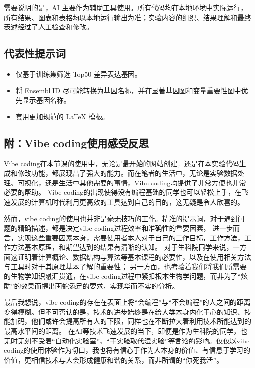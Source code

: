 \documentclass[12pt,fontset=fandol]{ctexart}
\begin{document}
需要说明的是，AI 主要作为辅助工具使用。所有代码均在本地环境中实际运行，所有结果、图表和表格均以本地运行输出为准；实验内容的组织、结果理解和最终表述经过了人工检查和修改。

\subsection{代表性提示词}
\begin{itemize}
  \item 仅基于训练集筛选 Top50 差异表达基因。
  \item 将 Ensembl ID 尽可能转换为基因名称，并在显著基因图和变量重要性图中优先显示基因名称。
  \item 套用更加规范的 LaTeX 模板。
\end{itemize}

\subsection{附：Vibe coding使用感受反思}

Vibe coding在本节课的使用中，无论是最开始的网站创建，还是在本实验代码生成和修改功能，都展现出了强大的能力。而在笔者的生活中，无论是实验数据处理、可视化，还是生活中其他需要的事情，Vibe coding均提供了非常方便也非常必要的帮助。
Vibe coding的出现使得没有编程基础的同学也可以轻松上手，在飞速发展的计算机时代利用更高效的工具达到自己的目的，这无疑是令人欣喜的。

然而，vibe coding的使用也并非是毫无技巧的工作。精准的提示词，对于遇到问题的精确描述，都是决定vibe coding过程效率和准确性的重要因素。
进一步而言，实现这些重要因素本身，需要使用者本人对于自己的工作目标，工作方法，工作方法基本原理，和期望达到的结果有清晰的认知。
对于生科院同学来说，一方面这证明着计算概论、数据结构与算法等基本课程的必要性，以及在使用相关方法与工具时对于其原理基本了解的重要性；
另一方面，也考验着我们将我们所需要的生物学知识融汇贯通，在vibe coding过程中紧扣根本生物学问题，而非为了“炫酷”的效果而提出画蛇添足的要求，实现华而不实的分析。

最后我想说，vibe coding的存在在表面上将“会编程”与“不会编程”的人之间的距离变得模糊。但不可否认的是，技术的进步始终是在给人类本身内化于心的知识、技能加码，他们或许会提高所有人的下限，同样也在不断拉大着利用技术所能达到的最高水平间的距离。
在AI等技术飞速发展的当下，即便是作为生科院的同学，也无时无刻不受着“自动化实验室”、“干实验取代湿实验”等言论的影响。仅仅以vibe coding的使用体验作为切口，我也将有信心于作为人本身的价值、有信息于学习的价值，更相信技术与人会形成健康和谐的关系，而非所谓的“你死我活”。
\end{document}
